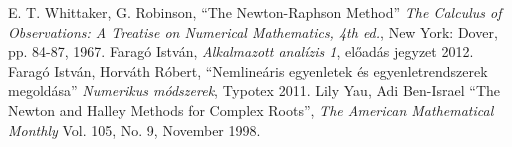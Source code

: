 \documentclass[a4paper,12pt]{report}
\begin{document}
	\begin{thebibliography}{99}
    	 E. T. Whittaker, G. Robinson, ``The Newton-Raphson Method'' \emph{The Calculus of Observations: A Treatise on Numerical Mathematics, 4th ed.}, New York: Dover, pp. 84-87, 1967. 
		 Faragó István, \emph{Alkalmazott analízis 1}, előadás jegyzet 2012.
         Faragó István, Horváth Róbert, ``Nemlineáris egyenletek és egyenletrendszerek megoldása'' \emph{Numerikus módszerek}, Typotex 2011.
         Lily Yau, Adi Ben-Israel ``The Newton and Halley Methods for Complex Roots'', \emph{The American Mathematical Monthly} Vol. 105, No. 9, November 1998. %

	\end{thebibliography}
\end{document}
